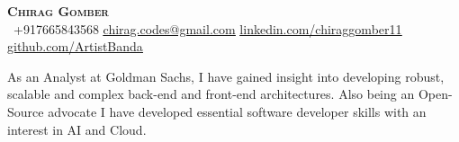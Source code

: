 \begin{center}
    \textbf{\Huge \scshape Chirag Gomber} \\ \vspace{1pt}
     \ \small +917665843568 \quad
    \href{mailto:chirag.codes@gmail.com}{ \underline{chirag.codes@gmail.com}} \quad
    \href{https://www.linkedin.com/in/chiraggomber11}{ \underline{linkedin.com/chiraggomber11}} \quad
    \href{https://github.com/ArtistBanda}{ \underline{github.com/ArtistBanda}}
\end{center}

\vspace{-3pt}
\centering 
\small
As an Analyst at Goldman Sachs, I have gained insight into developing robust, scalable and complex back-end and front-end architectures. Also being an Open-Source advocate I have developed essential software developer skills with an interest in AI and Cloud.
\vspace{-10pt}